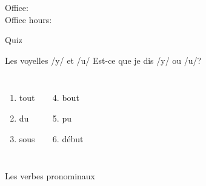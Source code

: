 \documentclass{beamer}
\subtitle[Verbes pronominaux]{Les verbes pronominaux}
\begin{document}
  \begin{frame}
    \titlepage
    \tiny{Office: \\
          Office hours: }
  \end{frame}

  \begin{frame}{}
    \begin{center}
      \Large Quiz
    \end{center}
  \end{frame}

  \begin{frame}{Les voyelles /y/ et /u/}
    Est-ce que je dis /y/ ou /u/?
    \begin{columns}
        \begin{enumerate}
          \item {} tout
          \item du 
          \item {} sous
        \end{enumerate}
        \begin{enumerate}
          \setcounter{enumi}{3}
          \item {} bout
          \item pu 
          \item début 
        \end{enumerate}
    \end{columns}
  \end{frame}

  \begin{frame}{Les verbes pronominaux}
    \begin{center}
      
    \end{center}
  \end{frame}
\end{document}
